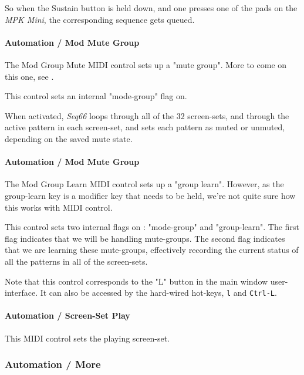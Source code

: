    So when the Sustain button is held down, and one presses one of the pads
   on the \textsl{MPK Mini}, the corresponding sequence gets queued.

\paragraph{Automation / Mod Mute Group}
\label{paragraph:configuration_midi_ctrl_modgmute}

   The Mod Group Mute MIDI control sets up a "mute group".
   More to come on this one,
   see .

   This control sets an internal "mode-group" flag on.

   When activated, \textsl{Seq66} loops through all of the 32
   screen-sets, and through the active pattern in each screen-set, and
   sets each pattern as muted or unmuted, depending on the saved mute state.

\paragraph{Automation / Mod Mute Group}
\label{paragraph:configuration_midi_ctrl_modgmute}

   The Mod Group Learn MIDI control sets up a "group learn".
   However, as the group-learn key is a modifier key that needs to
   be held, we're not quite sure how this works with MIDI control.

   This control sets two internal flags on : "mode-group" and "group-learn".
   The first flag indicates that we will be handling mute-groups.
   The second flag indicates that we are learning these mute-groups,
   effectively recording the current status of all the patterns in all of the
   screen-sets.

   Note that this control corresponds to the "L" button in the main window
   user-interface.
   It can also be accessed by the hard-wired hot-keys, \texttt{l} and
   \texttt{Ctrl-L}.

\paragraph{Automation / Screen-Set Play}
\label{paragraph:configuration_midi_ctrl_ssplay}

This MIDI control sets the playing screen-set.

\subsubsection{Automation / More}
\label{subsubsec:configuration_midi_ctrl_automationex}

